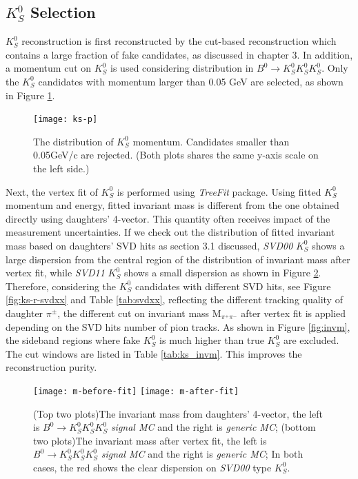 \subsection{$K_S^0$ Selection}
$K_S^0$ reconstruction is first reconstructed by the cut-based reconstruction which contains a large fraction of fake candidates, as discussed in chapter 3. In addition, a momentum cut on $K_S^0$ is used considering distribution in $B^0 \to K_S^0  K_S^0  K_S^0$. Only the $K_S^0$ candidates with momentum larger than 0.05 GeV are selected, as shown in Figure \ref{fig:ks-p}. 
\begin{figure}[ht]
	\centering
	\texttt{[image: ks-p]}
	\caption{The distribution of $K_S^0$ momentum. Candidates smaller than 0.05GeV/c are rejected. (Both plots shares the same y-axis scale on the left side.)}
	\label{fig:ks-p}
\end{figure}
Next, the vertex fit of $K_S^0$ is performed using \textit{TreeFit} package\cite{refId0}. Using fitted $K_S^0$ momentum and energy, fitted invariant mass is different from the one obtained directly using daughters' 4-vector. This quantity often receives impact of the measurement uncertainties. If we check out the distribution of fitted invariant mass based on daughters' SVD hits as section 3.1 discussed, \textit{SVD00} $K_S^0$ shows a large dispersion from the central region of the distribution of invariant mass after vertex fit, while \textit{SVD11} $K_S^0$ shows a small dispersion as shown in Figure \ref{fig:invm1}. Therefore, considering the $K_S^0$ candidates with different SVD hits, see Figure \ref{fig:ks-r-svdxx} and Table \ref{tab:svdxx}, reflecting the different tracking quality of daughter $\pi^{\pm}$, the different cut on invariant mass M$_{\pi^+\pi^-}$ after vertex fit is applied depending on the SVD hits number of pion tracks. As shown in Figure \ref{fig:invm}, the sideband regions where fake $K_S^0$ is much higher than true $K_S^0$ are excluded. The cut windows are listed in Table \ref{tab:ks_invm}. This improves the reconstruction purity.

\begin{figure}[htpb]
\centering
\texttt{[image: m-before-fit]}
\texttt{[image: m-after-fit]}
\caption{(Top two plots)The invariant mass from daughters' 4-vector, the left is $B^0 \to K_S^0  K_S^0  K_S^0$ \textit{signal MC} and the right is \textit{generic MC};
(bottom two plots)The invariant mass after vertex fit, the left is $B^0 \to K_S^0  K_S^0  K_S^0$ \textit{signal MC} and the right is \textit{generic MC};
In both cases, the red shows the clear dispersion on \textit{SVD00} type $K_S^0$.}
\label{fig:invm1}
\end{figure}
 
